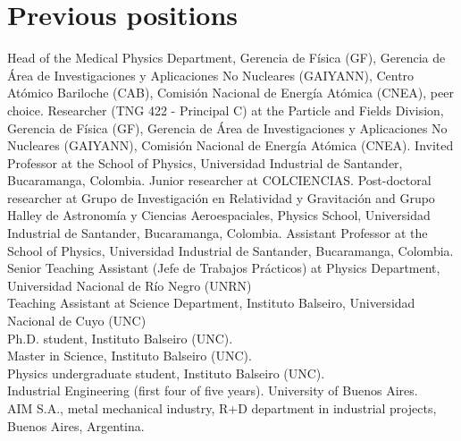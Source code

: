 \vspace{-1cm}
\ifres
\else
\ifeng
\section*{Previous positions}
\noindent
{} Head of the Medical Physics Department, Gerencia de Física (GF), Gerencia de Área de Investigaciones y Aplicaciones No Nucleares (GAIYANN), Centro Atómico Bariloche (CAB), Comisión Nacional de Energía Atómica (CNEA), peer choice.
 Researcher (TNG 422 - Principal C) at the Particle and Fields Division, Gerencia de Física (GF), Gerencia de Área de Investigaciones y Aplicaciones No Nucleares (GAIYANN), Comisión Nacional de Energía Atómica (CNEA).
 Invited Professor at the School of Physics, Universidad Industrial de Santander, Bucaramanga, Colombia. Junior researcher at COLCIENCIAS.
 Post-doctoral researcher at Grupo de Investigación en Relatividad y Gravitación and Grupo Halley de Astronomía y Ciencias Aeroespaciales, Physics School, Universidad Industrial de Santander, Bucaramanga, Colombia.
 Assistant Professor at the School of Physics, Universidad Industrial de Santander, Bucaramanga, Colombia.
 Senior Teaching Assistant (Jefe de Trabajos Prácticos) at Physics Department, Universidad Nacional de Río Negro (UNRN)\\
 Teaching Assistant at Science Department, Instituto Balseiro, Universidad Nacional de Cuyo (UNC)\\
 Ph.D. student, Instituto Balseiro (UNC).\\
 Master in Science, Instituto Balseiro (UNC).\\
 Physics undergraduate student, Instituto Balseiro (UNC).\\
 Industrial Engineering (first four of five years). University of Buenos Aires.\\
 AIM S.A., metal mechanical industry, R+D department in industrial projects, Buenos Aires, Argentina.\\
\else
